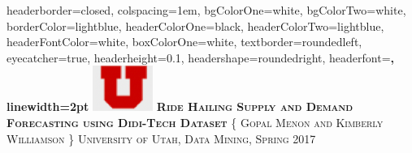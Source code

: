\documentclass[landscape,a0paper,fontscale=0.285]{baposter} %
\begin{document}
\begin{poster}
{
headerborder=closed, %
colspacing=1em, %
bgColorOne=white, %
bgColorTwo=white, %
borderColor=lightblue, %
headerColorOne=black, %
headerColorTwo=lightblue, %
headerFontColor=white, %
boxColorOne=white, %
textborder=roundedleft, %
eyecatcher=true, %
headerheight=0.1\textheight, %
headershape=roundedright, %
headerfont=\Large\bf\textsc, %
linewidth=2pt %
}
%
{\includegraphics[height=4em]{u_logo.png}} %
{\bf\textsc{Ride Hailing Supply and Demand Forecasting using Didi-Tech Dataset}\vspace{0.5em}} %
{\textsc{\{ Gopal Menon and Kimberly Williamson \} \hspace{12pt} University of Utah, Data Mining, Spring 2017}} %


\end{poster}
\end{document}
